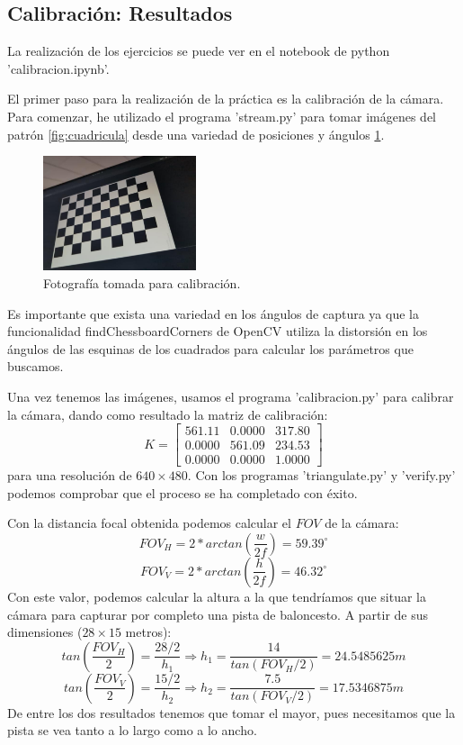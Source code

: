 \documentclass[12pt]{article}
\begin{document}
\subsection{Calibración: Resultados}

La realización de los ejercicios se puede ver en el notebook de python 'calibracion.ipynb'. 

El primer paso para la realización de la práctica es la calibración de la cámara. 
Para comenzar, he utilizado el programa 'stream.py' para tomar imágenes del patrón \ref{fig:cuadricula} desde una variedad de posiciones y ángulos \ref{fig:calibracion}. 
\begin{figure}[H]
    \centering
    \includegraphics[width=0.4\textwidth]{images_calibracion/Calibracion.png}
    \caption{Fotografía tomada para calibración.}
    \label{fig:calibracion}
\end{figure}
Es importante que exista una variedad en los ángulos de captura ya que la funcionalidad findChessboardCorners de OpenCV utiliza la distorsión en los ángulos de las esquinas de los cuadrados para calcular los parámetros que buscamos.

Una vez tenemos las imágenes, usamos el programa 'calibracion.py' para calibrar la cámara, dando como resultado la matriz de calibración:
$$
K=
\begin{bmatrix}
    561.11 & 0.0000 & 317.80 \\
    0.0000 & 561.09 & 234.53 \\
    0.0000 & 0.0000 & 1.0000
\end{bmatrix}
$$
para una resolución de $640 \times 480$. Con los programas 'triangulate.py' y 'verify.py' podemos comprobar que el proceso se ha completado con éxito.

Con la distancia focal obtenida podemos calcular el $FOV$ de la cámara:
$$FOV_H = 2*arctan \left( \frac{w}{2f} \right) = 59.39^{\circ}$$ 
$$FOV_V = 2*arctan \left( \frac{h}{2f} \right) = 46.32^{\circ}$$
Con este valor, podemos calcular la altura a la que tendríamos que situar la cámara para capturar por completo una pista de baloncesto.
A partir de sus dimensiones ($28 \times 15$ metros):
$$
tan \left( \frac{FOV_H}{2} \right) = \frac{28/2}{h_1} \Rightarrow h_1 = \frac{14}{tan(FOV_H/2)}=24.5485625m
$$
$$
tan \left( \frac{FOV_V}{2} \right) = \frac{15/2}{h_2} \Rightarrow h_2 = \frac{7.5}{tan(FOV_V/2)}=17.5346875m
$$
De entre los dos resultados tenemos que tomar el mayor, pues necesitamos que la pista se vea tanto a lo largo como a lo ancho.
\end{document}
